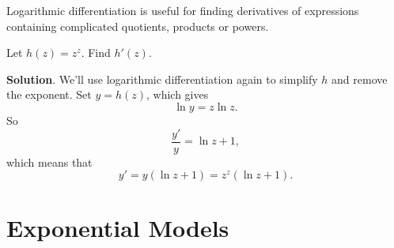 \documentclass[10pt,]{book}
\theoremstyle{ptxplainnotitle}
\theoremstyle{ptxplaintitle}
\theoremstyle{ptxplainnotitle}
\theoremstyle{ptxplaintitle}
\theoremstyle{ptxplainnotitle}
\theoremstyle{ptxplaintitle}
\theoremstyle{ptxdefinitionnotitle}
\theoremstyle{ptxdefinitiontitle}
\theoremstyle{ptxdefinitionnotitle}
\theoremstyle{ptxdefinitiontitle}
\theoremstyle{ptxdefinitionnotitle}
\theoremstyle{ptxdefinitiontitle}
\theoremstyle{ptxdefinitionnotitle}
\theoremstyle{ptxdefinitiontitle}
\theoremstyle{ptxdefinitionnotitle}
\theoremstyle{ptxdefinitiontitle}
\numberwithin{equation}{section}
\begin{document}
\hypertarget{p-243}{}%
Logarithmic differentiation is useful for finding derivatives of expressions containing complicated quotients, products or powers.%
\begin{example}\label{example-a-simple-exponent}
\hypertarget{p-244}{}%
Let \(h(z) = z^{z}\). Find \(h'(z)\).%
\par\smallskip%
\noindent\textbf{Solution}.\hypertarget{solution-53}{}\quad%
\hypertarget{p-245}{}%
We'll use logarithmic differentiation again to simplify \(h\) and remove the exponent. Set \(y = h(z)\), which gives%
\begin{equation*}
\ln y = z\ln z.
\end{equation*}
So%
\begin{equation*}
\frac{y'}{y} = \ln z + 1,
\end{equation*}
which means that%
\begin{equation*}
y' = y(\ln z + 1) = z^{z}(\ln z + 1).
\end{equation*}
%
\end{example}
\typeout{************************************************}
\typeout{************************************************}
\section[{Exponential Models}]{Exponential Models}\label{section-exponential-models}
\typeout{************************************************}
\typeout{************************************************}
\end{document}
